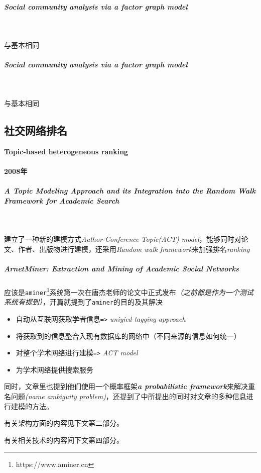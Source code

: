 \documentclass[UTF8]{ctexrep}
\begin{document}
\subparagraph{Social community analysis via a factor graph model}~\cite{yang2010social}
\par 与\cite{tang2009topic}基本相同

\subparagraph{Social community analysis via a factor graph model}~\cite{tan2010social}
\par 与\cite{tang2009topic,yang2010social}基本相同



\subsection{社交网络排名}
\textbf{Topic-based heterogeneous ranking}

\paragraph{2008年}
\subparagraph{A Topic Modeling Approach and its Integration into the Random Walk
Framework for Academic Search}~\cite{tang2008topic}
\par 建立了一种新的建模方式\textit{Author-Conference-Topic(ACT) model}，能够同时对论文、作者、出版物进行建模，还采用\textit{Random walk framework}来加强排名\textit{ranking}

\subparagraph{ArnetMiner: Extraction and Mining
of Academic Social Networks}\cite{tang2008arnetminer}
\par 应该是\texttt{aminer}\footnote{https://www.aminer.cn}系统第一次在唐杰老师的论文中正式发布\textit{（之前都是作为一个测试系统有提到）}，开篇就提到了\texttt{aminer}的目的及其解决
\begin{itemize}
    \item 自动从互联网获取学者信息\quad \texttt{=>} \quad \textit{uniyied tagging approach}
    \item 将获取到的信息整合入现有数据库的网络中（不同来源的信息如何统一）
    \item 对整个学术网络进行建模\quad \texttt{=>} \quad \textit{ACT model}
    \item 为学术网络提供搜索服务
\end{itemize}
\par 同时，文章里也提到他们使用一个概率框架\textbf{\textit{a probabilistic
framework}}来解决重名问题\textit{(name ambiguity problem)}，还提到了\cite{tang2008topic}中所提出的同时对文章的多种信息进行建模的方法。
\par 有关架构方面的内容见下文第二部分。
\par 有关相关技术的内容间下文第四部分。
\end{document}

